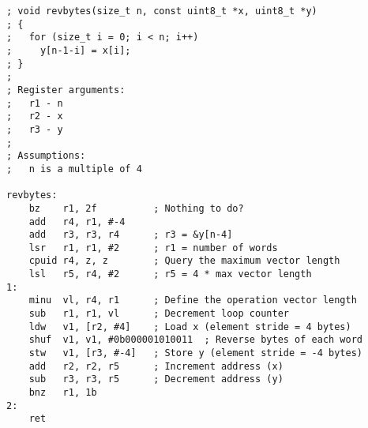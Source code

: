 \begin{lstlisting}[style=assembler]
; void revbytes(size_t n, const uint8_t *x, uint8_t *y)
; {
;   for (size_t i = 0; i < n; i++)
;     y[n-1-i] = x[i];
; }
;
; Register arguments:
;   r1 - n
;   r2 - x
;   r3 - y
;
; Assumptions:
;   n is a multiple of 4

revbytes:
    bz    r1, 2f          ; Nothing to do?
    add   r4, r1, #-4
    add   r3, r3, r4      ; r3 = &y[n-4]
    lsr   r1, r1, #2      ; r1 = number of words
    cpuid r4, z, z        ; Query the maximum vector length
    lsl   r5, r4, #2      ; r5 = 4 * max vector length
1:
    minu  vl, r4, r1      ; Define the operation vector length
    sub   r1, r1, vl      ; Decrement loop counter
    ldw   v1, [r2, #4]    ; Load x (element stride = 4 bytes)
    shuf  v1, v1, #0b000001010011  ; Reverse bytes of each word
    stw   v1, [r3, #-4]   ; Store y (element stride = -4 bytes)
    add   r2, r2, r5      ; Increment address (x)
    sub   r3, r3, r5      ; Decrement address (y)
    bnz   r1, 1b
2:
    ret
\end{lstlisting}

\twocolumn
